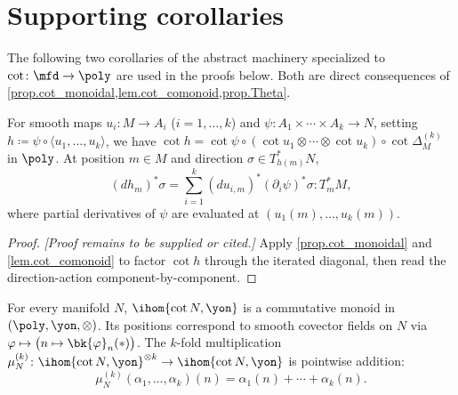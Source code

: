 
\section{Supporting corollaries}\label{sec.corollaries}

The following two corollaries of the abstract machinery specialized to $\cot\colon\mfd\to\poly$ are used in the proofs below. Both are direct consequences of \cref{prop.cot_monoidal,lem.cot_comonoid,prop.Theta}.

\begin{corollary}\label{cor.chain_rule}
For smooth maps $u_i\colon M\to A_i$ ($i=1,\ldots,k$) and $\psi\colon A_1\times\cdots\times A_k\to N$, setting $h\coloneqq\psi\circ\langle u_1,\ldots,u_k\rangle$, we have $\cot{h} = \cot{\psi}\circ(\cot{u_1}\otimes\cdots\otimes\cot{u_k})\circ\cot{\Delta_M^{(k)}}$ in $\poly$. At position $m\in M$ and direction $\sigma\in T^*_{h(m)}N$,
\[
(dh_m)^*\sigma = \sum_{i=1}^k (du_{i,m})^*(\partial_i\psi)^*\sigma: T^*_m M,
\]
where partial derivatives of $\psi$ are evaluated at $(u_1(m),\ldots,u_k(m))$.
\end{corollary}

\begin{proof}
\emph{[Proof remains to be supplied or cited.]} Apply \cref{prop.cot_monoidal} and \cref{lem.cot_comonoid} to factor $\cot h$ through the iterated diagonal, then read the direction-action component-by-component.
\end{proof}

\begin{corollary}\label{cor.covector_monoid}
For every manifold $N$, $\ihom{\cot N,\yon}$ is a commutative monoid in $(\poly,\yon,\otimes)$. Its positions correspond to smooth covector fields on $N$ via $\varphi\mapsto\bigl(n\mapsto\bk{\varphi}_n(*)\bigr)$. The $k$-fold multiplication $\mu_N^{(k)}\colon\ihom{\cot N,\yon}^{\otimes k}\to\ihom{\cot N,\yon}$ is pointwise addition:
\[
\mu_N^{(k)}(\alpha_1,\ldots,\alpha_k)(n) = \alpha_1(n)+\cdots+\alpha_k(n).
\]
\end{corollary}

